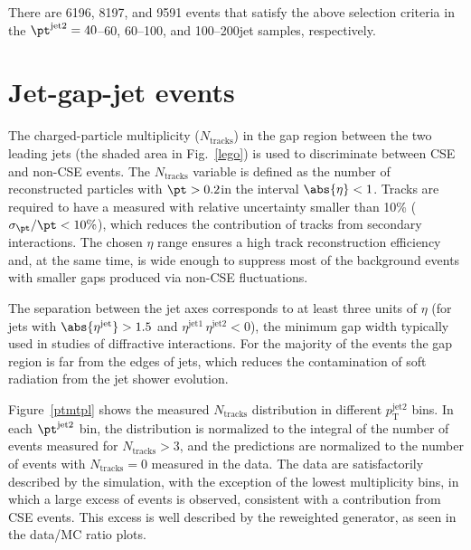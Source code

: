 \documentclass[11pt,twoside,a4paper,cmspaper,final,collab]{cms-tdr}
\begin{document}
There are 6196, 8197, and 9591 events that satisfy the above selection criteria in the $\pt^\text{jet2}= 40$--60, 60--100, and 100--200\GeV jet samples, respectively.

\section{Jet-gap-jet events}
\label{sec:jgj}

The charged-particle multiplicity ($N_\text{tracks}$) in the gap region between the two leading jets (the shaded area in Fig.~\ref{lego}) is used to discriminate between CSE and non-CSE events. The $N_\text{tracks}$ variable is defined as the number of reconstructed particles with $\pt>0.2$\GeV in the interval $\abs{\eta} < 1$. Tracks are required to have a measured \pt with relative uncertainty smaller than 10\% ($\sigma_{\pt}/\pt < 10\%$), which reduces the contribution of tracks from secondary interactions.
 The chosen $\eta$ range ensures a high track reconstruction efficiency and, at the same time, is wide enough to suppress most of the background events with smaller gaps produced via non-CSE fluctuations.

 The separation between the jet axes corresponds to at least three units of $\eta$ (for jets with $\abs{\eta^\text{jet}}> 1.5$ and $\eta^\mathrm{jet1} \, \eta^\text{jet2} < 0$), the minimum gap width typically used in studies of diffractive interactions. For the majority of the events the gap region is far from the edges of jets, which reduces the contamination of soft radiation from the jet shower evolution.

Figure~\ref{ptmtpl} shows the measured $N_\text{tracks}$ distribution in different $p^\text{jet2}_\mathrm{T}$ bins. In each $\pt^\text{jet2}$ bin, the  distribution is normalized to the integral of the number of events measured for $N_\text{tracks}>3$, and the  predictions are normalized to the number of events with $N_\text{tracks}=0$ measured in the data. The data are satisfactorily described by the  simulation, with the exception of the lowest multiplicity bins, in which a large excess of events is observed, consistent with a contribution from CSE events. This excess is well described by the reweighted  generator, as seen in the data/MC ratio plots.
\end{document}
